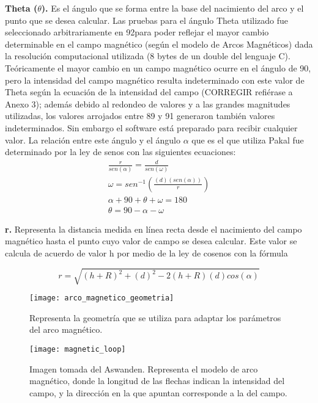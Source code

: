 \textbf{Theta ($\theta$). }Es el \'angulo que se forma entre la base del nacimiento del arco y el punto que se desea calcular. Las pruebas para el \'angulo Theta utilizado fue seleccionado arbitrariamente en 92\degree para poder reflejar el mayor cambio determinable en el campo magn\'etico (seg\'un el modelo de Arcos Magn\'eticos) dada la resoluci\'on computacional utilizada (8 bytes de un double del lenguaje C). Te\'oricamente el mayor cambio en un campo magn\'etico ocurre en el \'angulo de 90\degree, pero la intensidad del campo magn\'etico resulta indeterminado con este valor de Theta seg\'un la ecuaci\'on de la intensidad del campo (CORREGIR refi\'erase a Anexo 3); adem\'as debido al redondeo de valores y a las grandes magnitudes utilizadas, los valores arrojados entre 89 y 91 generaron tambi\'en valores indeterminados. Sin embargo el software est\'a preparado para recibir cualquier valor.\newline
La relaci\'on entre este \'angulo y el \'angulo $\alpha$ que es el que utiliza Pakal fue determinado por la ley de senos con las siguientes ecuaciones:
\begin{gather*} \label{theta_equation}
\frac{r}{sen(\alpha)} = \frac{d}{sen(\omega)} \\
\omega = sen^{-1}(\frac{(d)(sen(\alpha))}{r}) \\
\alpha + 90 + \theta + \omega = 180 \\
\theta = 90 - \alpha - \omega
\end{gather*}

\textbf{r. }Representa la distancia medida en l\'inea recta desde el nacimiento del campo magn\'etico hasta el punto cuyo valor de campo se desea calcular. Este valor se calcula de acuerdo de valor h por medio de la ley de cosenos con la f\'ormula
 
\begin{equation*} \label{r_equation}
r = \sqrt{ (h+R)^2 + (d)^2 - 2(h+R)(d)cos(\alpha)  }
\end{equation*}

\begin{figure}[h]
\centering
\texttt{[image: arco\_magnetico\_geometria]}
\caption{ Representa la geometr\'ia que se utiliza para adaptar los par\'ametros del arco magn\'etico. }
\label{arco_geometria}
\end{figure}

\begin{figure}[h]
\centering
\texttt{[image: magnetic\_loop]}
\caption{ Imagen tomada del Aswanden. Representa el modelo de arco magn\'etico, donde la longitud de las flechas indican la intensidad del campo, y la direcci\'on en la que apuntan corresponde a la del campo. }
\label{arco_magnetico}
\end{figure}
\clearpage

